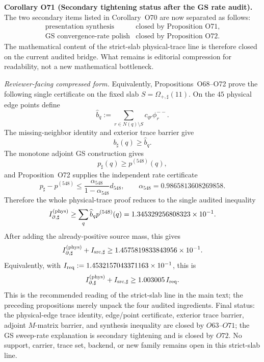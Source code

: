 \documentclass[aps,prd,onecolumn,notitlepage,nofootinbib,superscriptaddress,11pt,floatfix]{revtex4-2}
\begin{document}
\medskip\noindent\textbf{Corollary O71 (Secondary tightening status after the GS rate audit).}
The two secondary items listed in Corollary~O70 are now separated as follows:
\[
\begin{array}{ll}
\text{presentation synthesis} & \text{closed by Proposition~O71},\\
\text{GS convergence-rate polish} & \text{closed by Proposition~O72}.
\end{array}
\]
The mathematical content of the strict-slab physical-trace line is therefore closed on the current audited bridge.  What remains is editorial compression for readability, not a new mathematical bottleneck.

\medskip\noindent\emph{Reviewer-facing compressed form.}
Equivalently, Propositions~O68--O72 prove the following single certificate on the fixed slab \(S=\Omega_{+,\sharp}(11)\).  On the \(45\) physical edge points define
\[
\widehat b_q:=
\sum_{r\in N(q)\setminus S}c_{qr}\phi_r^{--}.
\]
The missing-neighbor identity and exterior trace barrier give
\[
b_\sharp(q)\ge\widehat b_q.
\]
The monotone adjoint GS construction gives
\[
p_\sharp(q)\ge p^{(548)}(q),
\]
and Proposition~O72 supplies the independent rate certificate
\[
p_\sharp-p^{(548)}
\le
\frac{\alpha_{548}}{1-\alpha_{548}}d_{548},
\qquad
\alpha_{548}=0.9865813608269858.
\]
Therefore the whole physical-trace proof reduces to the single audited inequality
\[
I_{\partial,\sharp}^{(\rm phys)}
\ge
\sum_q\widehat b_qp^{(548)}(q)
=1.345329256808323\times10^{-1}.
\]
After adding the already-positive source mass, this gives
\[
I_{\partial,\sharp}^{(\rm phys)}+I_{{\rm src},\sharp}
\ge
1.4575819833843956\times10^{-1}.
\]
Equivalently, with \(I_{\rm req}:=1.4532157043371163\times10^{-1}\), this is
\[
I_{\partial,\sharp}^{(\rm phys)}+I_{{\rm src},\sharp}
\ge
1.003005\,I_{\rm req}.
\]
This is the recommended reading of the strict-slab line in the main text; the preceding propositions merely unpack the four audited ingredients.  Final status: the physical-edge trace identity, edge/point certificate, exterior trace barrier, adjoint \(M\)-matrix barrier, and synthesis inequality are closed by \(O63\text{--}O71\); the GS sweep-rate explanation is secondary tightening and is closed by \(O72\).
No support, carrier, trace set, backend, or new family remains open in this strict-slab line.
\end{document}
